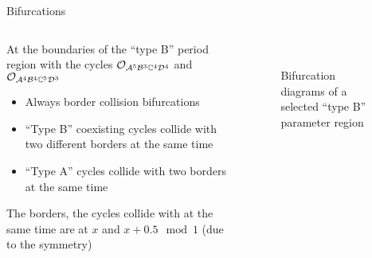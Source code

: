\begin{frame}{Bifurcations}
    \begin{columns}
        \begin{column}{.5 \textwidth}
            At the boundaries of the ``type B'' period region with the cycles $\mathcal{O}_{\mathcal{A}^5\mathcal{B}^3\mathbb{C}^4\mathcal{D}^4}$ and $\mathcal{O}_{\mathcal{A}^4\mathcal{B}^4\mathbb{C}^5\mathcal{D}^3}$
            \vspace{1em}
            \begin{itemize}
                \item Always border collision bifurcations
                \item ``Type B'' coexisting cycles collide with two different borders at the same time
                \item ``Type A'' cycles collide with two borders at the same time
            \end{itemize}
            \vspace{1em}
            The borders, the cycles collide with at the same time are at $x$ and $x + 0.5 \mod 1$ (due to the symmetry)
        \end{column}
        \begin{column}{.5 \textwidth}
            \vspace{-4em}
            \begin{figure}
                \centering
                \quad
                \\
                \quad
                \caption{Bifurcation diagrams of a selected ``type B'' parameter region}
            \end{figure}
        \end{column}
    \end{columns}
\end{frame}

